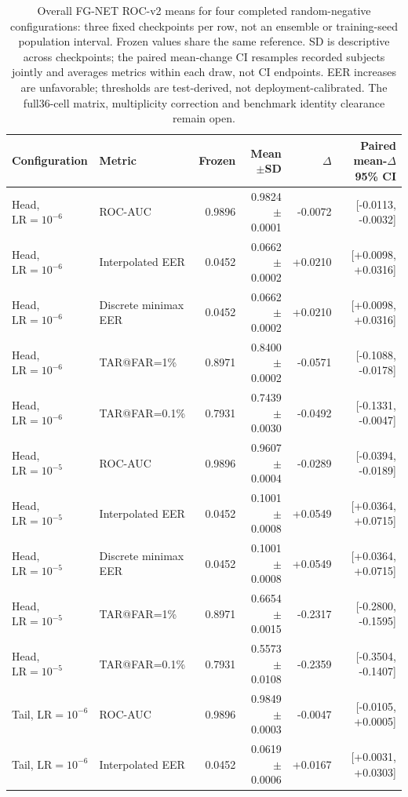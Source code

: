 \documentclass[journal]{IEEEtran}
\begin{document}
\begin{table}[!t]
\caption{Overall FG-NET ROC-v2 means for four completed random-negative configurations: three fixed checkpoints per row, not an ensemble or training-seed population interval. Frozen values share the same reference. SD is descriptive across checkpoints; the paired mean-change CI resamples recorded subjects jointly and averages metrics within each draw, not CI endpoints. EER increases are unfavorable; thresholds are test-derived, not deployment-calibrated. The full36-cell matrix, multiplicity correction and benchmark identity clearance remain open.}
\label{tab:strong-fixed-mean-overall}
\centering\scriptsize
\begin{tabular}{llrrrr}
\toprule
Configuration & Metric & Frozen & Mean$\pm$SD & $\Delta$ & Paired mean-$\Delta$ 95\% CI \\
\midrule
Head, $\mathrm{LR}=10^{-6}$ & ROC-AUC & 0.9896 & 0.9824$\pm$0.0001 & -0.0072 & [-0.0113, -0.0032] \\
Head, $\mathrm{LR}=10^{-6}$ & Interpolated EER & 0.0452 & 0.0662$\pm$0.0002 & +0.0210 & [+0.0098, +0.0316] \\
Head, $\mathrm{LR}=10^{-6}$ & Discrete minimax EER & 0.0452 & 0.0662$\pm$0.0002 & +0.0210 & [+0.0098, +0.0316] \\
Head, $\mathrm{LR}=10^{-6}$ & TAR@FAR=1\% & 0.8971 & 0.8400$\pm$0.0002 & -0.0571 & [-0.1088, -0.0178] \\
Head, $\mathrm{LR}=10^{-6}$ & TAR@FAR=0.1\% & 0.7931 & 0.7439$\pm$0.0030 & -0.0492 & [-0.1331, -0.0047] \\
Head, $\mathrm{LR}=10^{-5}$ & ROC-AUC & 0.9896 & 0.9607$\pm$0.0004 & -0.0289 & [-0.0394, -0.0189] \\
Head, $\mathrm{LR}=10^{-5}$ & Interpolated EER & 0.0452 & 0.1001$\pm$0.0008 & +0.0549 & [+0.0364, +0.0715] \\
Head, $\mathrm{LR}=10^{-5}$ & Discrete minimax EER & 0.0452 & 0.1001$\pm$0.0008 & +0.0549 & [+0.0364, +0.0715] \\
Head, $\mathrm{LR}=10^{-5}$ & TAR@FAR=1\% & 0.8971 & 0.6654$\pm$0.0015 & -0.2317 & [-0.2800, -0.1595] \\
Head, $\mathrm{LR}=10^{-5}$ & TAR@FAR=0.1\% & 0.7931 & 0.5573$\pm$0.0108 & -0.2359 & [-0.3504, -0.1407] \\
Tail, $\mathrm{LR}=10^{-6}$ & ROC-AUC & 0.9896 & 0.9849$\pm$0.0003 & -0.0047 & [-0.0105, +0.0005] \\
Tail, $\mathrm{LR}=10^{-6}$ & Interpolated EER & 0.0452 & 0.0619$\pm$0.0006 & +0.0167 & [+0.0031, +0.0303] \\

\end{tabular}
\end{table}
\end{document}
